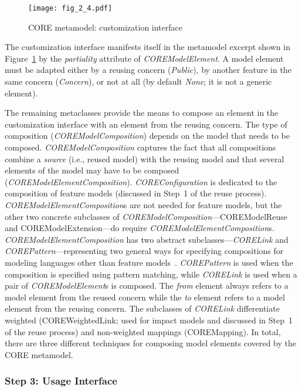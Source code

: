 \begin{figure}
	\centering
	\texttt{[image: fig\_2\_4.pdf]}
	\caption{CORE metamodel: customization interface}
	\label{fig:2.4}
\end{figure}

The customization interface manifests itself in the metamodel excerpt shown in Figure~\ref{fig:2.4} by the \emph{partiality} attribute of \textit{\cls COREModelElement}. A model element must be adapted either by a reusing concern (\emph{Public}), by another feature in the same concern (\emph{Concern}), or not at all (by default \emph{None}; it is not a generic element).

The remaining metaclasses provide the means to compose an element in the customization interface with an element from the reusing concern. The type of composition (\textit{\cls COREModelComposition}) depends on the model that needs to be composed. \textit{\cls COREModelComposition} captures the fact that all compositions combine a \emph{source} (i.e., reused model) with the reusing model and that several elements of the model may have to be composed (\textit{\cls COREModelElementComposition}). \textit{\cls COREConfiguration} is dedicated to the composition of feature models (discussed in Step~1 of the reuse process). \textit{\cls COREModelElementComposition}s are not needed for feature models, but the other two concrete subclasses of \textit{\cls COREModelComposition}---{\cls COREModelReuse} and {\cls COREModelExtension}---do require \textit{\cls COREModelElementComposition}s. \textit{\cls COREModelElementComposition} has two abstract subclasses---\textit{\cls CORELink} and \textit{\cls COREPattern}---representing two general ways for specifying compositions for modeling languages other than feature models~\cite{mussbacher2012assessing, alam2013revising}. \textit{\cls COREPattern} is used when the composition is specified using pattern matching, while \textit{\cls CORELink} is used when a pair of \textit{\cls COREModelElement}s is composed. The \emph{from} element always refers to a model element from the reused concern while the \emph{to} element refers to a model element from the reusing concern. The subclasses of \textit{\cls CORELink} differentiate weighted ({\cls COREWeightedLink}; used for impact models and discussed in Step~1 of the reuse process) and non-weighted mappings ({\cls COREMapping}). In total, there are three different techniques for composing model elements covered by the CORE metamodel.

\subsubsection{Step 3: Usage Interface}

